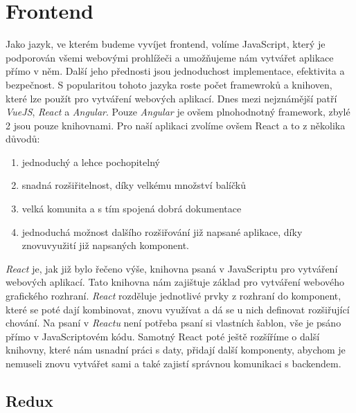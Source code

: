 \section{Frontend}

Jako jazyk, ve kterém budeme vyvíjet frontend, volíme JavaScript, který je podporován všemi webovými prohlížeči a umožňujeme nám vytvářet aplikace
přímo v něm. Další jeho přednosti jsou jednoduchost implementace, efektivita a bezpečnost. S popularitou tohoto jazyka roste počet framewroků a knihoven,
které lze použít pro vytváření webových aplikací. Dnes mezi nejznámější patří \textit{VueJS}, \textit{React} a \textit{Angular}. Pouze \textit{Angular} je ovšem plnohodnotný framework, zbylé
2 jsou pouze knihovnami. \cite{jsComparasion} Pro naší aplikaci zvolíme ovšem React a to z několika důvodů:
\begin{enumerate}
    \item jednoduchý a lehce pochopitelný
    \item snadná rozšiřitelnost, díky velkému množství balíčků
    \item velká komunita a s tím spojená dobrá dokumentace
    \item jednoduchá možnost dalšího rozšiřování již napsané aplikace, díky znovuvyužití již napsaných komponent.
\end{enumerate}

\textit{React} je, jak již bylo řečeno výše, knihovna psaná v JavaScriptu pro vytváření webových aplikací. Tato knihovna nám zajištuje základ pro vytváření webového grafického rozhraní.
\textit{React} rozděluje
jednotlivé prvky z rozhraní do komponent, které se poté dají kombinovat, znovu využívat a dá se u nich definovat rozšiřující chování. Na psaní v \textit{Reactu} není potřeba psaní
si vlastních šablon, vše je psáno přímo v JavaScriptovém kódu. \cite{reactJS} Samotný React poté ještě rozšíříme o další knihovny, které nám usnadní práci s daty, přidají
další komponenty, abychom je nemuseli znovu vytvářet sami a také zajistí správnou komunikaci s backendem.

\subsection{Redux}

